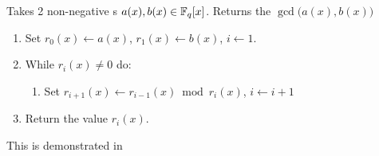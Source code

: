 \begin{definition}\label{def:Polynomial_Euclidean_Algorithm}
  Takes 2 non-negative s $a(x), b(x) \in \mathbb{F}_{q}[x]$.
  Returns the $\gcd \bigl( a(x), b(x) \bigr)$
  \begin{enumerate}[noitemsep]
  \item Set $r_{0}(x) \leftarrow a(x)$, $r_{1}(x) \leftarrow b(x)$, $i \leftarrow 1$.
  \item While $r_{i}(x) \neq 0$ do:
    \begin{enumerate}[noitemsep]
    \item Set $r_{i+1}(x) \leftarrow r_{i-1}(x) \bmod r_{i}(x)$, $i \leftarrow i + 1$
    \end{enumerate}
  \item Return the value $r_{i}(x)$.
  \end{enumerate}
  
  This is demonstrated in 
\end{definition}

